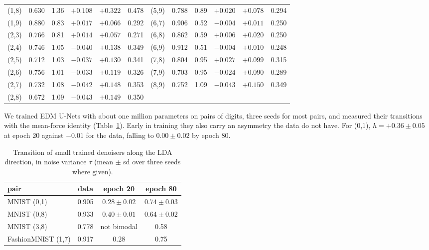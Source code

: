 \begin{table}[h]
\begin{center}
\begin{tabular}{lccccc|lccccc}
(1,8) & 0.630 & 1.36 & $+0.108$ & $+0.322$ & 0.478  & (5,9) & 0.788 & 0.89 & $+0.020$ & $+0.078$ & 0.294  \\
(1,9) & 0.880 & 0.83 & $+0.017$ & $+0.066$ & 0.292  & (6,7) & 0.906 & 0.52 & $-0.004$ & $+0.011$ & 0.250  \\
(2,3) & 0.766 & 0.81 & $+0.014$ & $+0.057$ & 0.271  & (6,8) & 0.862 & 0.59 & $+0.006$ & $+0.020$ & 0.250  \\
(2,4) & 0.746 & 1.05 & $-0.040$ & $+0.138$ & 0.349  & (6,9) & 0.912 & 0.51 & $-0.004$ & $+0.010$ & 0.248  \\
(2,5) & 0.712 & 1.03 & $-0.037$ & $+0.130$ & 0.341  & (7,8) & 0.804 & 0.95 & $+0.027$ & $+0.099$ & 0.315  \\
(2,6) & 0.756 & 1.01 & $-0.033$ & $+0.119$ & 0.326  & (7,9) & 0.703 & 0.95 & $-0.024$ & $+0.090$ & 0.289  \\
(2,7) & 0.732 & 1.08 & $-0.042$ & $+0.148$ & 0.353  & (8,9) & 0.752 & 1.09 & $-0.043$ & $+0.150$ & 0.349  \\
(2,8) & 0.672 & 1.09 & $-0.043$ & $+0.149$ & 0.350  & & & & & & \\

\bottomrule
\end{tabular}
\end{center}
\end{table}

We trained EDM U-Nets with about one million parameters on pairs of digits, three seeds for most pairs, and measured their transitions with the mean-force identity (Table~\ref{tab:small}). Early in training they also carry an asymmetry the data do not have. For (0,1), $h=+0.36\pm0.05$ at epoch 20 against $-0.01$ for the data, falling to $0.00\pm0.02$ by epoch 80.

\begin{table}[h]
\centering
\caption{Transition of small trained denoisers along the LDA direction, in noise variance $\tau$ (mean $\pm$ sd over three seeds where given).}
\label{tab:small}
\small
\begin{tabular}{lccc}
\toprule
pair & data & epoch 20 & epoch 80 \\
\midrule
MNIST (0,1) & 0.905 & $0.28\pm0.02$ & $0.74\pm0.03$ \\
MNIST (0,8) & 0.933 & $0.40\pm0.01$ & $0.64\pm0.02$ \\
MNIST (3,8) & 0.778 & not bimodal & 0.58 \\
FashionMNIST (1,7) & 0.917 & 0.28 & 0.75 \\
\bottomrule
\end{tabular}
\end{table}

